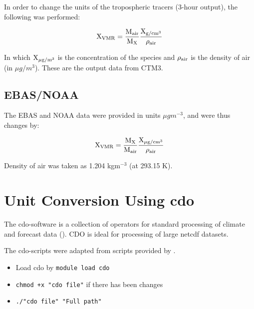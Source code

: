 \medskip

In order to change the units of the tropospheric tracers (3-hour output), the following was performed: 

\begin{equation}
    \mathrm{X_{VMR}} = \frac{\mathrm{M_{air}}}{\mathrm{M_{X}}}\frac{\mathrm{X_{ g/cm^{3}}}}{\mathrm{\rho_{air}}}
    \label{eq:vmr_trop_tracer}
\end{equation}

In which  $\mathrm{X_{\mu g/m^{3}}}$ is the concentration of the species and $\mathrm{\rho_{air}}$ is the density of air (in $\mu g/m^{3}$). These are the output data from CTM3.


\subsection{EBAS/NOAA}\label{sec:unit_conversion_EBASNOAA}

The EBAS and NOAA data were provided in units $\mu g m^{-3}$, and were thus changes by: 

\begin{equation}
    \mathrm{X_{VMR}} = \frac{\mathrm{M_X}}{\mathrm{M_{air}}}\frac{\mathrm{X_{\mu g/cm^{3}}}}{\mathrm{\rho_{air}}}
\end{equation}

Density of air was taken as 1.204 kgm$^{-3}$ (at 293.15 K). 


\section{Unit Conversion Using cdo}\label{sec:cdo}

The \acrshort{cdo}-software is a collection of operators for standard processing of climate and forecast data (\cite{cdo}). CDO is ideal for processing of large \acrshort{netcdf} datasets. 


\medskip

The \acrshort{cdo}-scripts were adapted from scripts provided by \cite{StefaniePersonal}. 



\begin{itemize}
    \item Load cdo by \texttt{module load cdo}
    \item \texttt{chmod +x "cdo file"} if there has been changes
    \item \texttt{./"cdo file" "Full path"} 
\end{itemize}


\cleardoublepage

